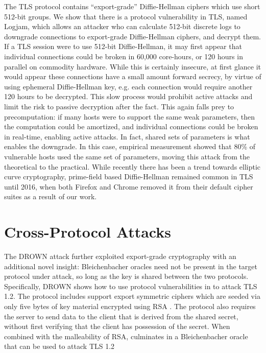 The TLS protocol contains ``export-grade'' Diffie-Hellman ciphers which use
short 512-bit groups. We show that there is a protocol vulnerability in TLS,
named Logjam, which allows an attacker who can calculate 512-bit discrete logs
to downgrade connections to export-grade Diffie-Hellman ciphers, and decrypt
them. If a TLS session were to use 512-bit Diffie-Hellman, it may first appear
that individual connections could be broken in 60,000 core-hours, or 120 hours
in parallel on commodity hardware. While this is certainly insecure, at first
glance it would appear these connections have a small amount forward secrecy,
by virtue of using ephemeral Diffie-Hellman key, e.g. each connection would
require another 120 hours to be decrypted. This slow process would prohibit
active attacks and limit the risk to passive decryption after the fact. This
again falls prey to precomputation: if many hosts were to support the same weak
parameters, then the computation could be amortized, and individual connections
could be broken in real-time, enabling active attacks. In fact, shared sets of
parameters is what enables the downgrade. In this case, empirical measurement
showed that 80\% of vulnerable hosts used the same set of parameters, moving
this attack from the theoretical to the practical. While recently there has
been a trend towards elliptic curve cryptography, prime-field based
Diffie-Hellman remained common in TLS until 2016, when both Firefox and Chrome
removed it from their default cipher suites as a result of our work.

\section{Cross-Protocol Attacks}

The DROWN attack further exploited export-grade cryptography with an additional
novel insight: Bleichenbacher oracles need not be present in the target
protocol under attack, so long as the key is shared between the two protocols.
Specifically, DROWN shows how to use protocol vulnerabilities in \ssltwo to
attack TLS 1.2. The \ssltwo protocol includes support export symmetric ciphers
which are seeded via only five bytes of key material encrypted using RSA \PKCS.
The \ssltwo protocol also requires the server to send data to the client that is
derived from the shared secret, without first verifying that the client has
possession of the secret. When combined with the malleability of RSA,
culminates in a Bleichenbacher oracle that can be used to attack TLS 1.2

